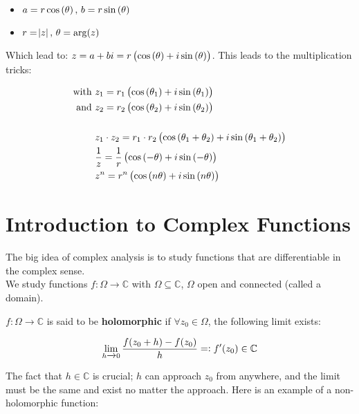 \begin{itemize}
    \item $a=r \cos \left(  \theta  \right) , \, b=r \sin \left( \theta \right)$
    \item $r = \abs{z}, \, \theta = \arg(z)$
\end{itemize}

Which lead to: $z=a+bi=r \left(  \cos \left( \theta \right) +i \sin \left( \theta  \right)  \right)$. This leads to the multiplication tricks:

\begin{align*}
\text{with } & z_1=r_1 \left(  \cos \left( \theta_1  \right) +i \sin \left( \theta_1  \right)  \right)\\
\text{and } & z_2=r_2 \left(  \cos \left( \theta_2  \right) +i \sin \left( \theta_2  \right)  \right)\\\\
& z_1\cdot z_2 = r_1 \cdot r_2 \left(  \cos \left( \theta_1+\theta_2 \right)+i \sin\left( \theta_1+\theta_2 \right) \right)\\
& \frac{1}{z} = \frac{1}{r} \left(  \cos \left(  -\theta  \right) +i \sin \left(  -\theta  \right)  \right)\\
& z^n = r^n \left(  \cos\left( n\theta \right)+i \sin\left( n\theta \right) \right)
\end{align*}


\section{Introduction to Complex Functions}

The big idea of complex analysis is to study functions that are differentiable in the complex sense.\\

We study functions $f:\Omega \xrightarrow{} \mathbb{C}$ with $\Omega \subseteq \mathbb{C}$, $\Omega$ open and connected (called a domain).


\begin{definition}[Holomorphism]
$f:\Omega \xrightarrow{} \mathbb{C}$ is said to be \textbf{holomorphic} if $\forall z_0 \in \Omega$, the following limit exists:

\begin{align*}
    \lim_{h\xrightarrow{} 0} \frac{f(z_0+h)-f(z_0)}{h} =\vcentcolon f'(z_0) \in \mathbb{C}\\
\end{align*}

\end{definition}

The fact that $h\in \mathbb{C}$ is crucial; $h$ can approach $z_0$ from anywhere, and the limit must be the same and exist no matter the approach. Here is an example of a non-holomorphic function:

